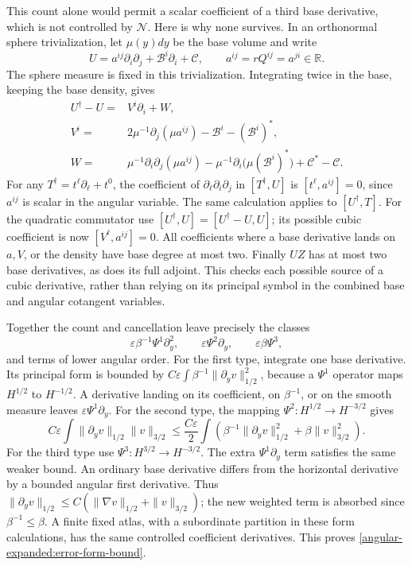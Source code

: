 \documentclass[11pt]{article}
\theoremstyle{definition}
\theoremstyle{remark}
\numberwithin{equation}{section}
\begin{document}
This count alone would permit a scalar coefficient of a third base
derivative, which is not controlled by $\mathcal N$.  Here is why none
survives.  In an orthonormal sphere trivialization, let $\mu(y)dy$ be the
base volume and write
\[
 U=a^{ij}\partial_i\partial_j+\mathcal B^i\partial_i+\mathcal C,
 \qquad a^{ij}=rQ^{ij}=a^{ji}\in\mathbb R.
\]
The sphere measure is fixed in this trivialization.  Integrating twice
in the base, keeping the base density, gives
\begin{align*}
 U^\dagger-U={}&V^i\partial_i+W,\\
 V^i={}&2\mu^{-1}\partial_j(\mu a^{ij})
                         -\mathcal B^i-(\mathcal B^i)^*,\\
 W={}&\mu^{-1}\partial_i\partial_j(\mu a^{ij})
       -\mu^{-1}\partial_i\bigl(\mu(\mathcal B^i)^*\bigr)
                         +\mathcal C^*-\mathcal C.
\end{align*}
For any $T^\dagger=t^\ell\partial_\ell+t^0$, the coefficient of
$\partial_\ell\partial_i\partial_j$ in $[T^\dagger,U]$ is
$[t^\ell,a^{ij}]=0$, since $a^{ij}$ is scalar in the angular variable.
The same calculation applies to $[U^\dagger,T]$.
For the quadratic commutator use
$[U^\dagger,U]=[U^\dagger-U,U]$; its possible cubic coefficient is now
$[V^\ell,a^{ij}]=0$.  All coefficients where a base derivative lands
on $a,V$, or the density have base degree at most two.  Finally $UZ$
has at most two base derivatives, as does its full adjoint.  This checks
each possible source of a cubic derivative, rather than relying on its
principal symbol in the combined base and angular cotangent variables.

Together the count and cancellation leave precisely the classes
\begin{equation}\label{angular-expanded:error-types}
 \varepsilon\beta^{-1}\Psi^1\partial_y^2,
 \qquad\varepsilon\Psi^2\partial_y,
 \qquad\varepsilon\beta\Psi^3,
\end{equation}
and terms of lower angular order.  For the first type, integrate one
base derivative.  Its principal form is bounded by
$C\varepsilon\int\beta^{-1}\|\partial_yv\|_{1/2}^2$,
because a $\Psi^1$ operator maps $H^{1/2}$ to $H^{-1/2}$.
A derivative landing on its coefficient, on $\beta^{-1}$, or on the
smooth measure leaves $\varepsilon\Psi^1\partial_y$.
For the second type, the mapping $\Psi^2:H^{1/2}\to H^{-3/2}$ gives
\[
 C\varepsilon\int\|\partial_yv\|_{1/2}\|v\|_{3/2}
 \leq\frac{C\varepsilon}{2}\int
       \left(\beta^{-1}\|\partial_yv\|_{1/2}^2
                               +\beta\|v\|_{3/2}^2\right).
\]
For the third type use $\Psi^3:H^{3/2}\to H^{-3/2}$.
The extra $\Psi^1\partial_y$ term satisfies the same weaker bound.
An ordinary base derivative differs from the horizontal derivative by a
bounded angular first derivative.  Thus
$\|\partial_yv\|_{1/2}\leq C(\|\nabla v\|_{1/2}+\|v\|_{3/2})$;
the new weighted term is absorbed since $\beta^{-1}\leq\beta$.
A finite fixed atlas, with a subordinate partition in these form
calculations, has the same controlled coefficient derivatives.  This proves
\eqref{angular-expanded:error-form-bound}.
\end{document}
